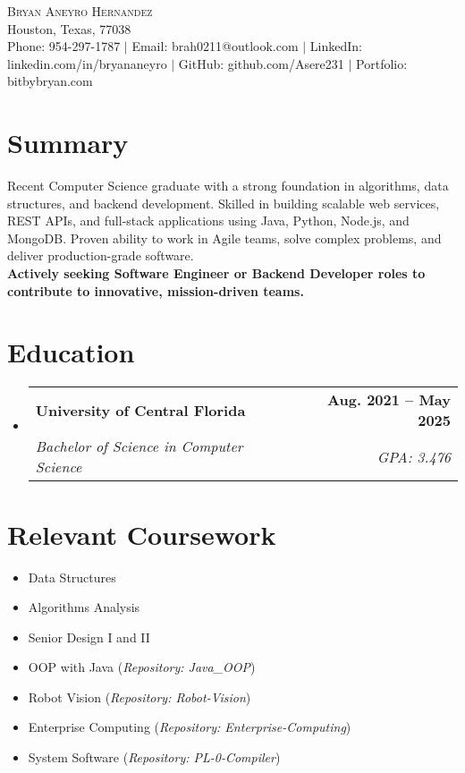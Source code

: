 \documentclass[letterpaper,11pt]{article}
\makeatletter
\newcommand{\resumeSubheading}[4]{
  \vspace{-2pt}\item
    \begin{tabular*}{1.0\textwidth}[t]{l@{\extracolsep{\fill}}r}
      \textbf{#1} & \textbf{\small #2} \\
      \textit{\small#3} & \textit{\small #4} \\
    \end{tabular*}\vspace{-7pt}
}
\newcommand{\resumeSubHeadingListStart}{\begin{itemize}[leftmargin=0.0in, label={}]}
\newcommand{\resumeSubHeadingListEnd}{\end{itemize}}
\makeatother
\begin{document}
\scriptsize

\begin{center}
    {\Huge \scshape Bryan Aneyro Hernandez} \\ \vspace{1pt}
    Houston, Texas, 77038 \\ \vspace{1pt}
    \small Phone: 954-297-1787 $|$ 
    \small Email: brah0211@outlook.com $|$ 
     \small LinkedIn: linkedin.com/in/bryananeyro $|$
    \small GitHub: github.com/Asere231 $|$
    \small Portfolio: bitbybryan.com
    \vspace{-8pt}
\end{center}

\section{Summary}
\small{
Recent Computer Science graduate with a strong foundation in algorithms, data structures, and backend development. Skilled in building scalable web services, REST APIs, and full-stack applications using Java, Python, Node.js, and MongoDB. Proven ability to work in Agile teams, solve complex problems, and deliver production-grade software.\\
\textbf{Actively seeking Software Engineer or Backend Developer roles to contribute to innovative, mission-driven teams.}
}

\section{Education}
\resumeSubHeadingListStart
  \resumeSubheading
    {University of Central Florida}{Aug. 2021 -- May 2025}
    {Bachelor of Science in Computer Science}{GPA: 3.476}
\resumeSubHeadingListEnd

\section{Relevant Coursework}
\begin{multicols}{2}
    \begin{itemize}[itemsep=-5pt, parsep=3pt]
        \item Data Structures
        \item Algorithms Analysis
        \item Senior Design I and II
        \item OOP with Java (\emph{Repository: Java\_OOP})
        \item Robot Vision (\emph{Repository: Robot-Vision})
        \item Enterprise Computing (\emph{Repository: Enterprise-Computing})
        \item System Software (\emph{Repository: PL-0-Compiler})
    \end{itemize}
\end{multicols}
\vspace*{2.0\multicolsep}
\end{document}
